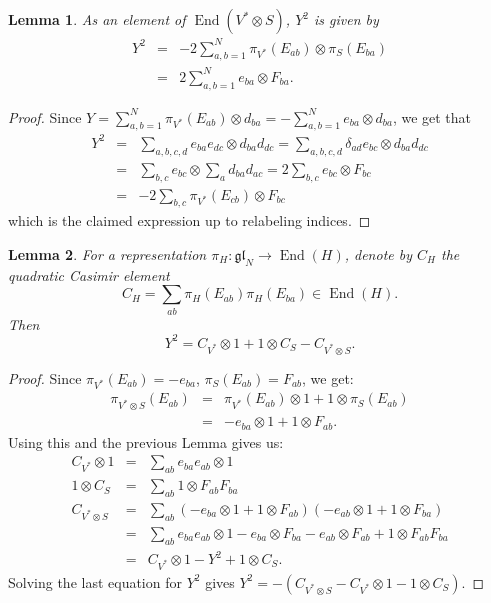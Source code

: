 \documentclass[11pt]{article}
\newtheorem{lemma}{Lemma}
\newcommand{\myd}{d}
\begin{document}
\begin{lemma}
    As an element of $\operatorname{End}(V^*\otimes S)$,  $Y^2$  is given by \begin{eqnarray*}
    Y^2 &=&  -2\sum_{a,b=1}^N \pi_{V^*}(E_{ab})\otimes \pi_{S}(E_{ba})
    \\ 
    &=& 2\sum_{a,b=1}^N e_{ba}\otimes F_{ba}.
    \end{eqnarray*}
\end{lemma}
\begin{proof}
    Since $Y=\sum_{a,b=1}^N \pi_{V^*}(E_{ab}) \otimes\myd_{ba} = -\sum_{a,b=1}^N e_{ba}\otimes\myd_{ba} $, we get that
    \begin{eqnarray*} Y^2 &=& \sum_{a,b,c,d} e_{ba} e_{dc} \otimes\myd_{ba} \myd_{dc} 
    = \sum_{a,b,c,d} \delta_{ad} e_{bc}\otimes \myd_{ba}\myd_{dc} \\
    &=& \sum_{b,c}  e_{bc} \otimes \sum_{a} \myd_{ba}\myd_{ac}
    = 2\sum_{b,c}  e_{bc} \otimes F_{bc}\\
    &=& -2\sum_{b,c} \pi_{V^*}(E_{cb}) \otimes F_{bc}
    \end{eqnarray*} which is the claimed expression up to relabeling indices.
\end{proof}

\begin{lemma} \label{lemma:Y2IsCasimir}
    For a representation $\pi_H : \mathfrak{gl}_N \to \operatorname{End}(H)$, denote by $C_H$ the quadratic Casimir element \[ C_H = \sum_{ab} \pi_H(E_{ab}) \pi_H(E_{ba})\in\operatorname{End}(H).\] Then \[ Y^2=C_{V^*}\otimes 1+ 1\otimes C_S -C_{V^*\otimes S}.\]
\end{lemma}
\begin{proof}
    Since $\pi_{V^*}(E_{ab})=-e_{ba}$, $\pi_S(E_{ab})=F_{ab}$, we get: 
    \begin{eqnarray*}
         \pi_{V^*\otimes S}(E_{ab}) &=& \pi_{V^*}(E_{ab}) \otimes 1 + 1\otimes \pi_{S}(E_{ab})  \\
         &=& -e_{ba}\otimes 1 + 1\otimes F_{ab}.
    \end{eqnarray*}
Using this and the previous Lemma gives us: \begin{eqnarray*}
        C_{V^*}\otimes 1 &=& \sum_{ab} e_{ba}e_{ab}\otimes 1 \\
        1\otimes C_{S} &=& \sum_{ab} 1\otimes F_{ab} F_{ba} \\
        C_{V^*\otimes S} &=& \sum_{ab} (-e_{ba}\otimes 1+1\otimes F_{ab})(-e_{ab}\otimes 1+1\otimes F_{ba}) \\
        &=& \sum_{ab} e_{ba}e_{ab}\otimes 1 - e_{ba}\otimes F_{ba} - e_{ab}\otimes F_{ab}
        + 1\otimes F_{ab}F_{ba} \\
        &=& C_{V^*}\otimes 1 -  Y^2 + 1\otimes C_S.
    \end{eqnarray*}
    Solving the last equation for $Y^2$ gives $ Y^2=-(C_{V^*\otimes S}-C_{V^*}\otimes 1-1\otimes C_S)$.
\end{proof}
\end{document}
